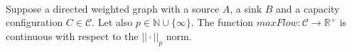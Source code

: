 {}
\begin{theorem} \ \\
  \label{maxflowcont}
  Suppose a directed weighted graph with a source $A$, a sink $B$ and a capacity configuration $C \in \mathcal{C}$. Let
  also $p \in \mathbb{N} \cup \{\infty\}$. The function $maxFlow : \mathcal{C} \rightarrow \mathbb{R}^{+}$ is continuous
  with respect to the $||\cdot||_p$ norm.
\end{theorem}
